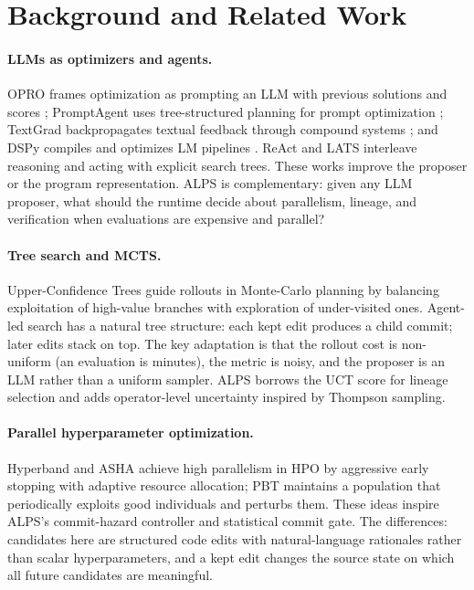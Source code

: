 \documentclass{article}
\newcommand{\alps}{ALPS\xspace}
\begin{document}
\section{Background and Related Work}
\label{sec:related}

\paragraph{LLMs as optimizers and agents.}
OPRO frames optimization as prompting an LLM with previous solutions and scores \citep{yang2023opro}; PromptAgent uses tree-structured planning for prompt optimization \citep{promptagent}; TextGrad backpropagates textual feedback through compound systems \citep{textgrad}; and DSPy compiles and optimizes LM pipelines \citep{dspy}. ReAct and LATS \citep{react,lats} interleave reasoning and acting with explicit search trees. These works improve the proposer or the program representation. \alps is complementary: given any LLM proposer, what should the runtime decide about parallelism, lineage, and verification when evaluations are expensive and parallel?

\paragraph{Tree search and MCTS.}
Upper-Confidence Trees \citep{uct} guide rollouts in Monte-Carlo planning by balancing exploitation of high-value branches with exploration of under-visited ones. Agent-led search has a natural tree structure: each kept edit produces a child commit; later edits stack on top. The key adaptation is that the rollout cost is non-uniform (an evaluation is minutes), the metric is noisy, and the proposer is an LLM rather than a uniform sampler. \alps borrows the UCT score for lineage selection and adds operator-level uncertainty inspired by Thompson sampling.

\paragraph{Parallel hyperparameter optimization.}
Hyperband \citep{hyperband} and ASHA \citep{asha} achieve high parallelism in HPO by aggressive early stopping with adaptive resource allocation; PBT \citep{pbt} maintains a population that periodically exploits good individuals and perturbs them. These ideas inspire \alps's commit-hazard controller and statistical commit gate. The differences: candidates here are structured code edits with natural-language rationales rather than scalar hyperparameters, and a kept edit changes the source state on which all future candidates are meaningful.
\end{document}
